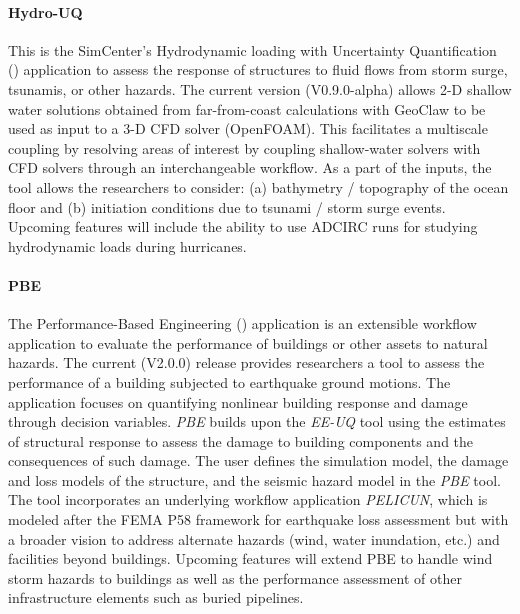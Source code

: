 \paragraph{Hydro-UQ} This is the SimCenter's Hydrodynamic loading with Uncertainty Quantification () application to assess the response of structures to fluid flows from storm surge, tsunamis, or other hazards. The current version (V0.9.0-alpha) allows 2-D shallow water solutions obtained from far-from-coast calculations with GeoClaw  to be used as input to a 3-D CFD solver (OpenFOAM). This facilitates a multiscale coupling by resolving areas of interest by coupling shallow-water solvers with CFD solvers through an interchangeable workflow. As a part of the inputs, the tool allows the researchers to consider: (a) bathymetry / topography of the ocean floor and (b) initiation conditions due to tsunami / storm surge events. Upcoming features will include the ability to use ADCIRC runs for studying hydrodynamic loads during hurricanes.

\paragraph{PBE} The Performance-Based Engineering () application is an extensible workflow application to evaluate the performance of buildings or other assets to natural hazards. The current (V2.0.0) release provides researchers a tool to assess the performance of a building subjected to earthquake ground motions. The application focuses on quantifying nonlinear building response and damage through decision variables. \emph{PBE} builds upon the \emph{EE-UQ} tool using the estimates of structural response to assess the damage to building components and the consequences of such damage. The user defines the simulation model, the damage and loss models of the structure, and the seismic hazard model in the \emph{PBE} tool. The tool incorporates an underlying workflow application \emph{PELICUN}, which is modeled after the FEMA P58 framework for earthquake loss assessment but with a broader vision to address alternate hazards (wind, water inundation, etc.) and facilities beyond buildings. Upcoming features will extend PBE to handle wind storm hazards to buildings as well as the performance assessment of other infrastructure elements such as buried pipelines.

